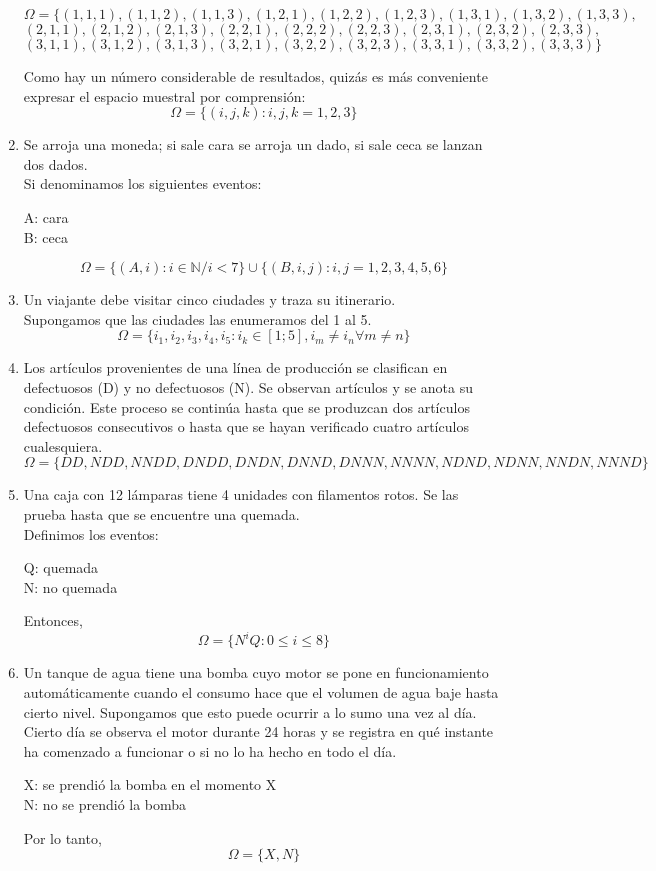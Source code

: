 \begin{enumerate}
\begin{center}
                $\Omega=\{(1,1,1),(1,1,2),(1,1,3),(1,2,1),(1,2,2),(1,2,3),(1,3,1),(1,3,2),(1,3,3),$\\
                $(2,1,1),(2,1,2),(2,1,3),(2,2,1),(2,2,2),(2,2,3),(2,3,1),(2,3,2),(2,3,3),$\\
                $(3,1,1),(3,1,2),(3,1,3),(3,2,1),(3,2,2),(3,2,3),(3,3,1),(3,3,2),(3,3,3)\}$
            \end{center}
            Como hay un número considerable de resultados, quizás es más conveniente expresar el espacio muestral por comprensión:
            \[\Omega=\{(i,j,k):i,j,k=1,2,3\}\]
        \item Se arroja una moneda; si sale cara se arroja un dado, si sale ceca se lanzan dos dados.\e\\
            Si denominamos los siguientes eventos:
            \begin{center}
                A: cara\\
                B: ceca
            \end{center}
            \[\Omega=\{(A,i):i\in\mathbb{N}/i<7\}\cup\{(B,i,j):i,j=1,2,3,4,5,6\}\]
        \item Un viajante debe visitar cinco ciudades y traza su itinerario.\e\\
            Supongamos que las ciudades las enumeramos del 1 al 5.\[\Omega=\{i_1,i_2,i_3,i_4,i_5:i_k\in[1;5],i_m\neq i_n\forall m\neq n\}\]
        \item Los artículos provenientes de una línea de producción se clasifican en defectuosos (D) y no defectuosos (N). Se observan artículos y se anota su condición. Este proceso se continúa hasta que se produzcan dos artículos defectuosos consecutivos o hasta que se hayan verificado cuatro artículos cualesquiera.
            \[\Omega=\{DD,NDD,NNDD,DNDD,DNDN,DNND,DNNN,NNNN,NDND,NDNN,NNDN,NNND\}\]
        \item Una caja con 12 lámparas tiene 4 unidades con filamentos rotos. Se las prueba hasta que se encuentre una
        quemada.\e\\
            Definimos los eventos:
            \begin{center}
                Q: quemada\\
                N: no quemada
            \end{center}
            Entonces,
            \[\Omega=\{N^iQ:0\leq i\leq8\}\]
        \item Un tanque de agua tiene una bomba cuyo motor se pone en funcionamiento automáticamente cuando el consumo
        hace que el volumen de agua baje hasta cierto nivel. Supongamos que esto puede ocurrir a lo sumo una vez al
        día. Cierto día se observa el motor durante 24 horas y se registra en qué instante ha comenzado a funcionar o
        si no lo ha hecho en todo el día.\e
            \begin{center}
                X: se prendió la bomba en el momento X\\
                N: no se prendió la bomba
            \end{center}
            Por lo tanto,
            \[\Omega=\{X,N\}\]
    \end{enumerate}